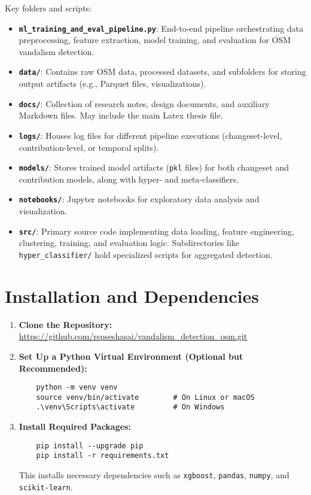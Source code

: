 \documentclass[
    13pt, %
    a4paper, %
    listof=totoc, %
    bibliography=totoc, %
    index=totoc, %
    headsepline
]{scrreprt}
\begin{document}
\noindent
Key folders and scripts:
\begin{itemize}
    \item \textbf{\texttt{ml\_training\_and\_eval\_pipeline.py}}: End-to-end pipeline orchestrating data preprocessing, feature extraction, model training, and evaluation for OSM vandalism detection.
    \item \textbf{\texttt{data/}}: Contains raw OSM data, processed datasets, and subfolders for storing output artifacts (e.g., Parquet files, visualizations).
    \item \textbf{\texttt{docs/}}: Collection of research notes, design documents, and auxiliary Markdown files. May include the main Latex thesis file.
    \item \textbf{\texttt{logs/}}: Houses log files for different pipeline executions (changeset-level, contribution-level, or temporal splits).
    \item \textbf{\texttt{models/}}: Stores trained model artifacts (\texttt{pkl} files) for both changeset and contribution models, along with hyper- and meta-classifiers.
    \item \textbf{\texttt{notebooks/}}: Jupyter notebooks for exploratory data analysis and visualization.
    \item \textbf{\texttt{src/}}: Primary source code implementing data loading, feature engineering, clustering, training, and evaluation logic. Subdirectories like \texttt{hyper\_classifier/} hold specialized scripts for aggregated detection.
\end{itemize}

\section{Installation and Dependencies}
\label{sec:installation}

\begin{enumerate}
    \item \textbf{Clone the Repository:}
    \newline \url{https://github.com/rspseshasai/vandalism_detection_osm.git}

    \item \textbf{Set Up a Python Virtual Environment (Optional but Recommended):}
    \begin{verbatim}
    python -m venv venv
    source venv/bin/activate        # On Linux or macOS
    .\venv\Scripts\activate         # On Windows
    \end{verbatim}

    \item \textbf{Install Required Packages:}
    \begin{verbatim}
    pip install --upgrade pip
    pip install -r requirements.txt
    \end{verbatim}
    This installs necessary dependencies such as \texttt{xgboost}, \texttt{pandas}, \texttt{numpy}, and \texttt{scikit-learn}.
\end{enumerate}
\end{document}
